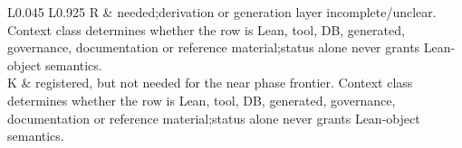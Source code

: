 \begin{longtable}{L{0.045\linewidth} L{0.925\linewidth}}
\hline
\addlinespace[0.24em]
R & needed;\newline derivation or generation layer incomplete/\allowbreak{}unclear. Context class determines whether the row is Lean, tool, DB, generated, governance, documentation or reference material;\newline status alone never grants Lean-object semantics.\\
\hline
\addlinespace[0.24em]
K & registered, but not needed for the near phase frontier. Context class determines whether the row is Lean, tool, DB, generated, governance, documentation or reference material;\newline status alone never grants Lean-object semantics.\\
\hline
\addlinespace[0.24em]
\end{longtable}
\normalsize
